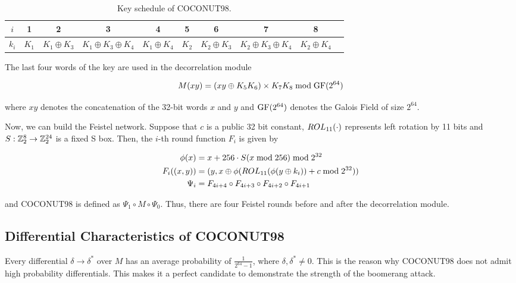 \documentclass[twoside]{article}
\begin{document}
\begin{table}[!ht]
    \centering
    \begin{tabular}{|c|c|c|c|c|c|c|c|c|c|}
        \hline
        \(i\) & 1 & 2 & 3 & 4 & 5 & 6 & 7 & 8 \\
        \hline
        \(k_i\) & \(K_1\) & \(K_1 \oplus K_3\) & \(K_1 \oplus K_3 \oplus K_4\) &
        \(K_1 \oplus K_4\) & \(K_2\) & \(K_2 \oplus K_3\) & \(K_2 \oplus K_3
        \oplus K_4\) & \(K_2 \oplus K_4\) \\
        \hline
    \end{tabular}
    \caption{Key schedule of COCONUT98.}
    \label{fig:coconut-key-schedule}
\end{table}

The last four words of the key are used in the decorrelation module

\begin{equation}
    M(xy) = (xy \oplus K_5K_6) \times K_7K_8 \bmod{\textrm{GF}(2^{64})}
    \label{eq:coconut-m}
\end{equation}

where \(xy\) denotes the concatenation of the 32-bit words \(x\) and \(y\) and
\(\textrm{GF}(2^{64})\) denotes the Galois Field of size \(2^{64}\).

Now, we can build the Feistel network. Suppose that \(c\) is a public 32 bit
constant, \(ROL_{11}(\cdot)\) represents left rotation by 11 bits and \(S :
\mathbb Z_2^8 \rightarrow \mathbb Z_2^{24}\) is a fixed S box. Then, the \(i\)-th round
function \(F_i\) is given by

\begin{align}
    \phi(x) &= x + 256\cdot S(x \bmod 256) \bmod 2^{32} \\
    F_i((x, y)) &= (y, x \oplus \phi(ROL_{11}(\phi(y \oplus k_i)) + c \bmod 2^{32})) \\
    \Psi_i &= F_{4i+4} \circ F_{4i+3} \circ F_{4i+2} \circ F_{4i+1}
\end{align}

and COCONUT98 is defined as \(\Psi_1 \circ M \circ \Psi_0\). Thus, there are
four Feistel rounds before and after the decorrelation module.

\subsection{Differential Characteristics of COCONUT98}
Every differential \(\delta \rightarrow \delta^*\) over \(M\) has an average
probability of \(\frac{1}{2^{64} - 1}\), where \(\delta, \delta^* \neq 0\). This
is the reason why COCONUT98 does not admit high probability differentials. This
makes it a perfect candidate to demonstrate the strength of the boomerang
attack.
\end{document}
